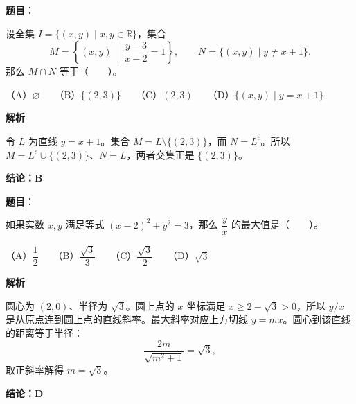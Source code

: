 \begin{answer}

\textbf{题目}：

设全集 $I=\{(x,y)\mid x,y\in\mathbb R\}$，集合
\nopagebreak[4]
\[
M=\left\{(x,y)\ \middle|\ \frac{y-3}{x-2}=1\right\},\qquad N=\{(x,y)\mid y\ne x+1\}.
\]
那么 $\overline{M}\cap\overline{N}$ 等于\mbox{（　　）}。

（A）$\varnothing$　　（B）$\{(2,3)\}$　　（C）$(2,3)$　　（D）$\{(x,y)\mid y=x+1\}$

\textbf{解析}

令 $L$ 为直线 $y=x+1$。集合 $M=L\setminus\{(2,3)\}$，而 $N=L^c$。所以 $\overline M=L^c\cup\{(2,3)\}$、$\overline N=L$，两者交集正是 $\{(2,3)\}$。

\textbf{结论：B}


\end{answer}
\begin{answer}

\textbf{题目}：

如果实数 $x,y$ 满足等式 $(x-2)^2+y^2=3$，那么 $\dfrac yx$ 的最大值是\mbox{（　　）}。

（A）$\dfrac12$　　（B）$\dfrac{\sqrt3}{3}$　　（C）$\dfrac{\sqrt3}{2}$　　（D）$\sqrt3$

\textbf{解析}

圆心为 $(2,0)$、半径为 $\sqrt3$。圆上点的 $x$ 坐标满足 $x\ge2-\sqrt3>0$，所以 $y/x$ 是从原点连到圆上点的直线斜率。最大斜率对应上方切线 $y=mx$。圆心到该直线的距离等于半径：
\nopagebreak[4]
\[
\frac{2m}{\sqrt{m^2+1}}=\sqrt3,
\]
取正斜率解得 $m=\sqrt3$。

\textbf{结论：D}


\end{answer}
